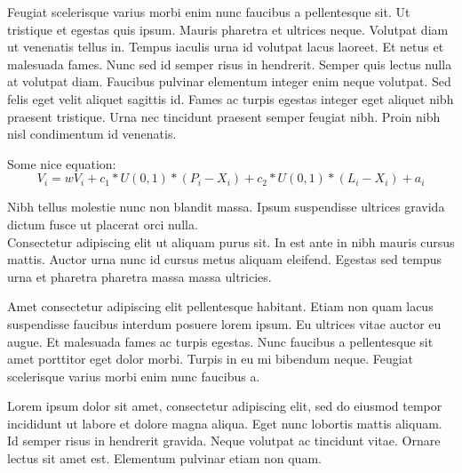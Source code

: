 {
    Feugiat scelerisque varius morbi enim nunc faucibus a pellentesque sit. Ut tristique et egestas quis ipsum. Mauris pharetra et ultrices neque. Volutpat diam ut venenatis tellus in. Tempus iaculis urna id volutpat lacus laoreet. Et netus et malesuada fames. Nunc sed id semper risus in hendrerit. Semper quis lectus nulla at volutpat diam. Faucibus pulvinar elementum integer enim neque volutpat. Sed felis eget velit aliquet sagittis id. Fames ac turpis egestas integer eget aliquet nibh praesent tristique. Urna nec tincidunt praesent semper feugiat nibh. Proin nibh nisl condimentum id venenatis\cite{C01}.
    
    \vspace{5pt}
    Some nice equation:
    \vspace{5pt}
    \begin{equation} 
        V_{i} = wV_{i} + c_{1} * U(0,1) * (P_{i} - X_{i}) + c_{2} * U(0,1) * (L_{i} - X_{i}) + a_{i} \label{eqn:velocityChargedUpdate} 
    \end{equation} 
}

{
    Nibh tellus molestie nunc non blandit massa. Ipsum suspendisse ultrices gravida dictum fusce ut placerat orci nulla.\\
    
    
    Consectetur adipiscing elit ut aliquam purus sit. In est ante in nibh mauris cursus mattis. Auctor urna nunc id cursus metus aliquam eleifend. Egestas sed tempus urna et pharetra pharetra massa massa ultricies.
    
    Amet consectetur adipiscing elit pellentesque habitant. Etiam non quam lacus suspendisse faucibus interdum posuere lorem ipsum. Eu ultrices vitae auctor eu augue. Et malesuada fames ac turpis egestas. Nunc faucibus a pellentesque sit amet porttitor eget dolor morbi. Turpis in eu mi bibendum neque. Feugiat scelerisque varius morbi enim nunc faucibus a.
}

{
\setlength{\columnsep}{30pt}
\begin{multicols*}{2}
Lorem ipsum dolor sit amet, consectetur adipiscing elit, sed do eiusmod tempor incididunt ut labore et dolore magna aliqua. Eget nunc lobortis mattis aliquam. Id semper risus in hendrerit gravida. Neque volutpat ac tincidunt vitae. Ornare lectus sit amet est. Elementum pulvinar etiam non quam.

\pagebreak

\end{multicols*}
}